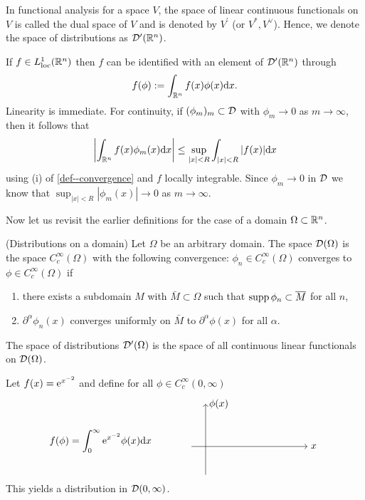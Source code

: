 \documentclass[11pt]{article}
\begin{document}
			In functional analysis for a space $V$, the space of linear continuous functionals on $V$ is called the dual space of $V$ and is denoted by $V^\prime$ (or $V^\ast,V^\vee$). Hence, we denote the space of distributions as $\mathcal{D}^\prime(\mathbb{R}^n)$.

			\begin{eg}
				If $f\in L^1_\mathrm{loc}(\mathbb{R}^n)$ then $f$ can be identified with an element of $\mathcal{D}^\prime(\mathbb{R}^n)$ through 
				\begin{equation*}
					f(\phi):=\int_{\mathbb{R}^n}f(x)\phi(x)\mathrm{d}x.
				\end{equation*}
				Linearity is immediate. For continuity, if $(\phi_m)_m\subset\mathcal{D}$ with $\phi_m\to0$ as $m\to\infty$, then it follows that
				\begin{equation*}
					\left|\int_{\mathbb{R}^n}f(x)\phi_m(x)\mathrm{d}x\right|\le\sup_{|x|<R}\int_{|x|<R}|f(x)|\mathrm{d}x
				\end{equation*}
				using (i) of \autoref{def--convergence} and $f$ locally integrable. Since $\phi_m\to0$ in $\mathcal{D}$ we know that $\sup_{|x|<R}|\phi_m(x)|\to0$ as $m\to\infty$.
			\end{eg}

			Now let us revisit the earlier definitions for the case of a domain $\Omega\subset\mathbb{R}^n$.

			\begin{defi}
				(Distributions on a domain) Let $\Omega$ be an arbitrary domain. The space $\mathcal{D}(\Omega)$ is the space $C^\infty_c(\Omega)$ with the following convergence: $\phi_n\in C^\infty_c(\Omega)$ converges to $\phi\in C^\infty_c(\Omega)$ if
				\begin{enumerate}
					\item there exists a subdomain $M$ with $\bar{M}\subset\Omega$ such that $\operatorname{supp}\phi_n\subset\overline{M}$ for all $n$,
					\item $\partial^\alpha\phi_n(x)$ converges uniformly on $\bar{M}$ to $\partial^\alpha\phi(x)$ for all $\alpha$.
				\end{enumerate}
				The space of distributions $\mathcal{D}^\prime(\Omega)$ is the space of all continuous linear functionals on $\mathcal{D}(\Omega)$.
			\end{defi}

			\begin{eg}
				Let $f(x)=\mathrm{e}^{x^{-2}}$ and define for all $\phi\in C^\infty_c(0,\infty)$ 
				\begin{equation*}
					f(\phi)=\int_0^\infty\e{x^{-2}}\phi(x)\mathrm{d}x\qquad\qquad
					\begin{tikzpicture}[baseline=.1cm]
						\draw[->] (-2,0)--(2.1,0) node [right]{$x$};
						\draw[->] (-1.5,-1)--(-1.5,1.5) node [right]{$\phi(x)$};
						\draw[line width=.5mm] plot [smooth] file {plots/bump.table};
						\draw[line width=.5mm] plot [smooth] file {plots/bump1.table};
					\end{tikzpicture}
				\end{equation*}
				This yields a distribution in $\mathcal{D}(0,\infty)$.
			\end{eg}
\end{document}
